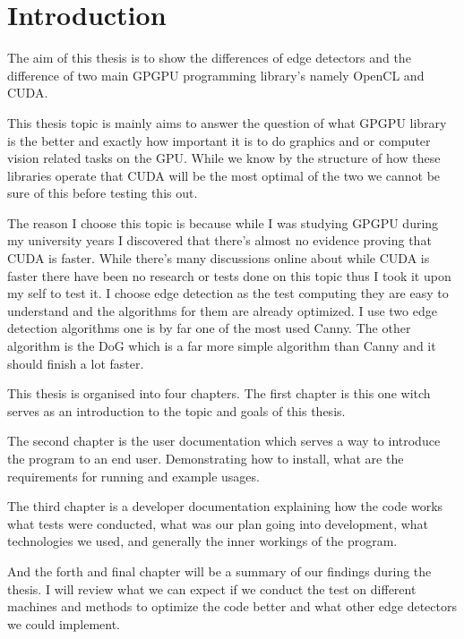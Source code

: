 \chapter{Introduction}
\label{chap:intro}

The aim of this thesis is to show the differences of edge detectors and the difference of two main \ac{GPGPU} programming library's namely OpenCL and CUDA.

This thesis 	topic is mainly aims to answer the question of what \ac{GPGPU} library is the better and exactly how important it is to do graphics and or computer vision related tasks on the \ac{GPU}. While we know by the structure of how these libraries operate that CUDA will be the most optimal of the two we cannot be sure of this before testing this out.

The reason I choose this topic is because while I was studying \ac{GPGPU} during my university years I discovered that there's almost no evidence proving that CUDA is faster. While there's many discussions online about while CUDA is faster there have been no research or tests done on this topic thus I took it upon my self to test it. I choose edge detection as the test computing they are easy to understand and the algorithms for them are already optimized. I use two edge detection algorithms one is by far one of the most used \ac{Canny}. The other algorithm is the \ac{DoG} which is a far more simple algorithm than \ac{Canny} and it should finish a lot faster.

This thesis is organised into four chapters. The first chapter is this one witch serves as an introduction to the topic and goals of this thesis.

The second chapter is the user documentation which serves a way to introduce the program to an end user. Demonstrating how to install, what are the requirements for running and example usages.

The third chapter is a developer documentation explaining how the code works what tests were conducted, what was our plan going into development, what technologies we used, and generally the inner workings of the program.

And the forth and final chapter will be a summary of our findings during the thesis. I will review what we can expect if we conduct the test on different machines and methods to optimize the code better and what other edge detectors we could implement.